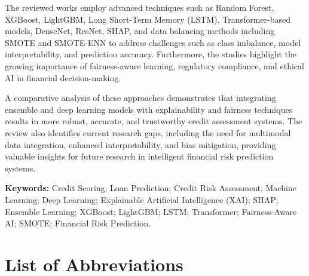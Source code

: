 \documentclass[12pt,a4paper,final]{extreport}
\begin{document}
The reviewed works employ advanced techniques such as Random Forest, XGBoost, LightGBM, Long Short-Term Memory (LSTM), Transformer-based models, DenseNet, ResNet, SHAP, and data balancing methods including SMOTE and SMOTE-ENN to address challenges such as class imbalance, model interpretability, and prediction accuracy. Furthermore, the studies highlight the growing importance of fairness-aware learning, regulatory compliance, and ethical AI in financial decision-making.

A comparative analysis of these approaches demonstrates that integrating ensemble and deep learning models with explainability and fairness techniques results in more robust, accurate, and trustworthy credit assessment systems. The review also identifies current research gaps, including the need for multimodal data integration, enhanced interpretability, and bias mitigation, providing valuable insights for future research in intelligent financial risk prediction systems.

\vspace{0.5cm}
\noindent
\textbf{Keywords:} Credit Scoring; Loan Prediction; Credit Risk Assessment; Machine Learning; Deep Learning; Explainable Artificial Intelligence (XAI); SHAP; Ensemble Learning; XGBoost; LightGBM; LSTM; Transformer; Fairness-Aware AI; SMOTE; Financial Risk Prediction.
\endgroup

\newpage

\thispagestyle{plain}
\begingroup
{}
\tableofcontents
\endgroup
\begingroup
{}
\listoffigures
{}
\listoftables
{}
\endgroup

\chapter*{List of Abbreviations}
\end{document}
